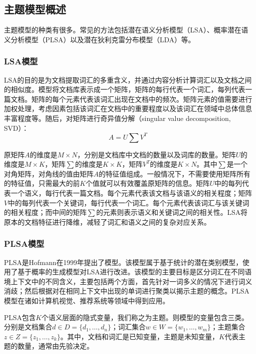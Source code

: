 \subsection{主题模型概述}

主题模型的种类有很多。常见的方法包括潜在语义分析模型（LSA）、概率潜在语义分析模型（PLSA）以及潜在狄利克雷分布模型（LDA）等。

\subsubsection{LSA模型}
LSA\cite{deerwester1990indexing}的目的是为文档提取词汇的多重含义，并通过内容分析计算词汇以及文档之间的相似度。模型将文档库表示成一个矩阵，矩阵的每行代表一个词汇，每列代表一篇文档。矩阵的每个元素代表该词汇出现在文档中的频次。矩阵元素的值需要进行加权处理，考虑因素包括该词汇在文档中的重要程度以及该词汇在领域中总体信息丰富程度等。随后，对矩阵进行奇异值分解（singular value decomposition, SVD）\cite{higham2015singular}：
\begin{equation}
	A = U\sum V^T
\end{equation}

原矩阵$A$的维度是$M \times N$，分别是文档库中文档的数量以及词库的数量。矩阵$U$的维度是$M \times K$，矩阵$\sum$的维度是$K \times K$，矩阵$V^T$的维度是$K \times N$。其中$\sum$是一个对角矩阵，对角线的值由矩阵$A$的特征值组成。一般情况下，不需要使用矩阵所有的特征值，只需最大的前$K$个值就可以有效覆盖原矩阵的信息。矩阵$U$中的每列代表一个语义，每行代表一篇文档。每个元素代表该文档与该语义的相关程度；矩阵$V$中的每列代表一个关键词，每行代表一个词汇。每个元素代表该词汇与该关键词的相关程度；而中间的矩阵$\sum$的元素则表示语义和关键词之间的相关性。LSA将原本的文档特征进行降维，减轻了词汇和语义之间的复杂对应关系。

\subsubsection{PLSA模型}
PLSA是Hofmann\cite{hofmann1999probabilistic}在1999年提出了模型。该模型属于基于统计的潜在类别模型，使用了基于概率的生成模型对LSA进行改进。该模型的主要目标是区分词汇在不同语境上下文中的不同含义，主要包括两个方面，首先针对一词多义的情况下进行词义消歧；然后根据对在相同上下文中出现的单词进行聚类以揭示主题的概念。PLSA模型在诸如计算机视觉、推荐系统等领域中得到应用。

PLSA包含$K$个语义层面的隐式变量，我们称之为主题。则模型的变量包含三类。分别是文档集合$d \in D = \{d_1, \dots, d_n\}$；词汇集合$w \in W = \{w_1, \dots, w_m\}$；主题集合$z \in Z = \{z_1, \dots, z_k\}$。其中，文档和词汇是已知变量，主题是未知变量，$K$代表主题的数量，通常由先验决定。

